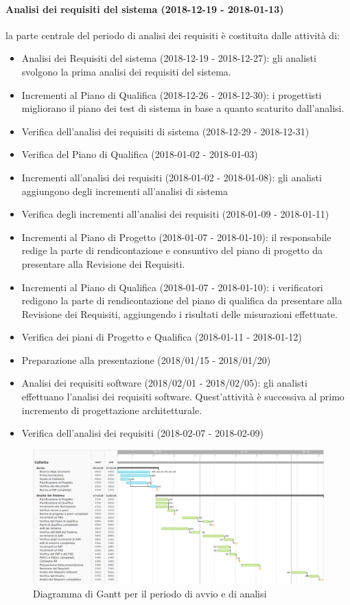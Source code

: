 		\paragraph{Analisi dei requisiti del sistema (2018-12-19 - 2018-01-13)\\} la parte centrale del periodo di analisi dei requisiti è costituita dalle attività di:
			\begin{itemize}
				\item Analisi dei Requisiti del sistema (2018-12-19 - 2018-12-27): gli analisti svolgono la prima analisi dei requisiti del sistema.
				\item Incrementi al Piano di Qualifica (2018-12-26 - 2018-12-30): i progettisti migliorano il piano dei test di sistema in base a quanto scaturito dall'analisi.
				\item Verifica dell'analisi dei requisiti di sistema (2018-12-29 - 2018-12-31)
				\item Verifica del Piano di Qualifica (2018-01-02 - 2018-01-03)
				\item Incrementi all'analisi dei requisiti (2018-01-02 - 2018-01-08): gli analisti aggiungono degli incrementi all'analisi di sistema
				\item Verifica degli incrementi all'analisi dei requisiti (2018-01-09 - 2018-01-11)
				\item Incrementi al Piano di Progetto (2018-01-07 - 2018-01-10): il responsabile redige la parte di rendicontazione e consuntivo del piano di progetto da presentare alla Revisione dei Requisiti.
				\item Incrementi al Piano di Qualifica (2018-01-07 - 2018-01-10): i verificatori redigono la parte di rendicontazione del piano di qualifica da presentare alla Revisione dei Requisiti, aggiungendo i risultati delle misurazioni effettuate.
				\item Verifica dei piani di Progetto e Qualifica (2018-01-11 - 2018-01-12)
				\item Preparazione alla presentazione (2018/01/15 - 2018/01/20)
				\item Analisi dei requisiti software (2018/02/01 - 2018/02/05): gli analisti effettuano l'analisi dei requisiti software. Quest'attività è successiva al primo incremento di progettazione architetturale.
				\item Verifica dell'analisi dei requisiti (2018-02-07 - 2018-02-09)				
			\end{itemize}
	\newpage
	\begin{figure}[!hbtp]
		\centering
		\includegraphics[scale=0.5,angle=90]{images/gantt.png}
		\caption{Diagramma di Gantt per il periodo di avvio e di analisi}
	\end{figure}
	\newpage